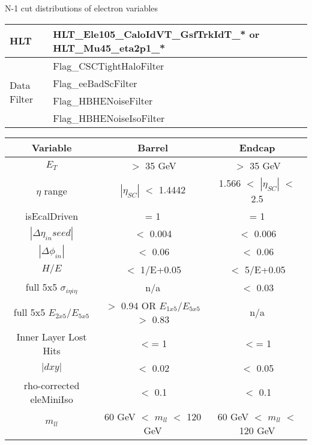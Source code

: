 \documentclass[7pt,aspectratio=1610]{beamer}
\begin{document}
\begin{frame}
  \justifying
  \LARGE{N-1 cut distributions of electron variables}
  \begin{tiny}
    \begin{center}
      \begin{tabular}[t]{ | l | l | }
        \hline
        HLT
        & HLT\_Ele105\_CaloIdVT\_GsfTrkIdT\_* or HLT\_Mu45\_eta2p1\_*  \\
        \hline
        \multirow{4}{*}{Data Filter}
        & Flag\_CSCTightHaloFilter                  \\
        & Flag\_eeBadScFilter                       \\
        & Flag\_HBHENoiseFilter                     \\
        & Flag\_HBHENoiseIsoFilter                  \\
        \hline
      \end{tabular}
    \end{center}
  \end{tiny}

  \begin{tiny}
    \begin{center}
      \begin{tabular}{ | c | c | c | }
        \hline
        \bf Variable & \bf Barrel & \bf Endcap \\
        \hline
        $E_T$                      & $>$ 35 GeV               & $>$ 35 GeV        \\
        $\eta$ range               & $|\eta_{SC}|$ $<$ 1.4442 & 1.566 $<$ $|\eta_{SC}|$ $<$ 2.5 \\
        isEcalDriven               & = 1                      & = 1               \\
        $|\Delta\eta_{in} seed|$   & $<$ 0.004                & $<$ 0.006         \\
        $|\Delta\phi_{in}|$        & $<$ 0.06                 & $<$ 0.06          \\
        $H/E$                      & $<$ 1/E+0.05             & $<$ 5/E+0.05      \\
        full 5x5 $\sigma_{i\eta i\eta}$ & n/a                 & $<$ 0.03          \\
        full 5x5 $E_{2x5}/E_{5x5}$ & $>$ 0.94 OR $E_{1x5}/E_{5x5}$ $>$ 0.83 & n/a \\
        Inner Layer Lost Hits      & $<$= 1                   & $<$= 1            \\
        $|dxy|$                    & $<$ 0.02                 & $<$ 0.05          \\
        rho-corrected eleMiniIso   & $<$ 0.1                  & $<$ 0.1           \\
        $m_{ll}$                   & 60 GeV $<$ $m_{ll}$ $<$ 120 GeV & 60 GeV $<$ $m_{ll}$ $<$ 120 GeV \\
        \hline
      \end{tabular}
    \end{center}
  \end{tiny}
\end{frame}
\end{document}
